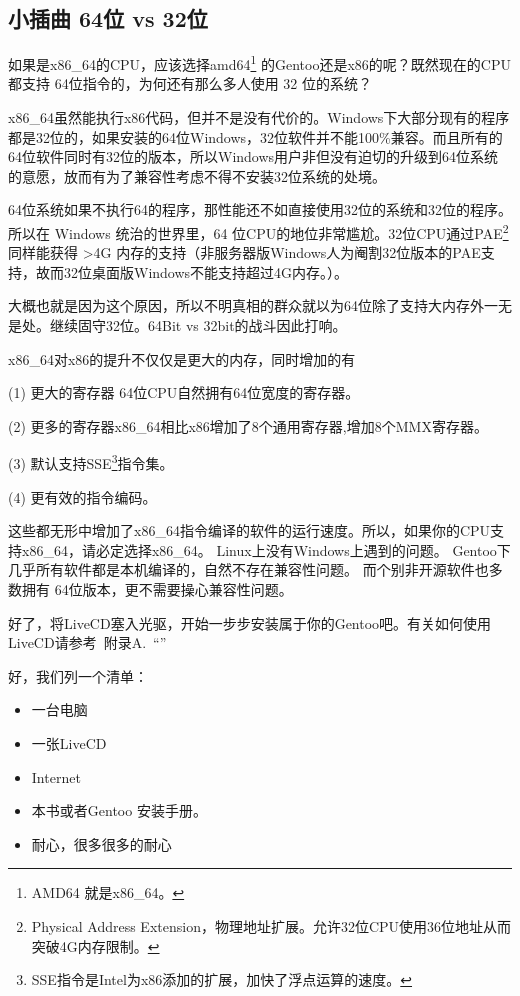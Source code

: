 \documentclass[amstex]{ctexbook}
\newenvironment{insertnote}{ \ttfamily\CJKfamily{KaiTi} }{\vskip 1cm }
\newcommand{\faqref}[1]{~附录A.\nameref{FAQ}~“\nameref{#1}”}
\begin{document}
\begin{insertnote}
\subsection*{小插曲  64位 vs 32位}

如果是x86\_64的CPU，应该选择amd64\footnote{AMD64 就是x86\_64。}
的Gentoo还是x86的呢？既然现在的CPU都支持 64位指令的，为何还有那么多人使用 32 位的系统？

x86\_64虽然能执行x86代码，但并不是没有代价的。Windows下大部分现有的程序都是32位的，如果安装的64位Windows，32位软件并不能100\%兼容。而且所有的64位软件同时有32位的版本，所以Windows用户非但没有迫切的升级到64位系统的意愿，放而有为了兼容性考虑不得不安装32位系统的处境。

64位系统如果不执行64的程序，那性能还不如直接使用32位的系统和32位的程序。所以在 Windows 统治的世界里，64 位CPU的地位非常尴尬。32位CPU通过PAE\footnote{Physical Address Extension，物理地址扩展。允许32位CPU使用36位地址从而突破4G内存限制。}同样能获得 >4G 内存的支持（非服务器版Windows人为阉割32位版本的PAE支持，故而32位桌面版Windows不能支持超过4G内存。）。

大概也就是因为这个原因，所以不明真相的群众就以为64位除了支持大内存外一无是处。继续固守32位。64Bit vs 32bit的战斗因此打响。

x86\_64对x86的提升不仅仅是更大的内存，同时增加的有

(1)  更大的寄存器 64位CPU自然拥有64位宽度的寄存器。

(2)  更多的寄存器x86\_64相比x86增加了8个通用寄存器,增加8个MMX寄存器。

(3)  默认支持SSE\footnote{SSE指令是Intel为x86添加的扩展，加快了浮点运算的速度。}指令集。

(4)  更有效的指令编码。

这些都无形中增加了x86\_64指令编译的软件的运行速度。所以，如果你的CPU支持x86\_64，请必定选择x86\_64。
Linux上没有Windows上遇到的问题。
Gentoo下几乎所有软件都是本机编译的，自然不存在兼容性问题。
而个别非开源软件也多数拥有 64位版本，更不需要操心兼容性问题。
\end{insertnote}



好了，将LiveCD塞入光驱，开始一步步安装属于你的Gentoo吧。有关如何使用LiveCD请参考\faqref{FAQ:UseLiveCD}

好，我们列一个清单：


\begin{itemize}
\item[ \checked] 一台电脑
\item[ \checked] 一张LiveCD
\item[ \checked] Internet
\item[ \checked] 本书或者Gentoo 安装手册。
\item[ \checked] 耐心，很多很多的耐心
\end{itemize}
\end{document}
